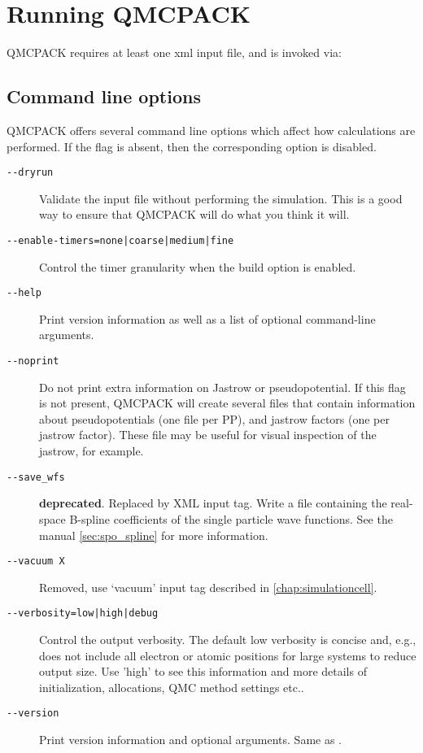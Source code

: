 \chapter{Running QMCPACK}
\label{chap:running}

QMCPACK requires at least one xml input file, and is invoked via:

{}

\section{Command line options}
\label{sec:commandline}
QMCPACK offers several command line options which affect how calculations
are performed. If the flag is absent, then the corresponding
option is disabled.

\begin{description}
\item[\texttt{-{}-dryrun}]{ Validate the input file without performing the simulation.
  This is a good way to ensure that QMCPACK will do what you think it will. }
\item[\texttt{-{}-enable-timers=none|coarse|medium|fine}]{ Control the timer granularity
  when the build option  is enabled. }
\item[\texttt{-{}-help}]{ Print version information as well as a list of optional
  command-line arguments. }
\item[\texttt{-{}-noprint}]{ Do not print extra information on Jastrow or pseudopotential.
  If this flag is not present, QMCPACK will create several  files
  that contain information about pseudopotentials (one file per PP), and jastrow
  factors (one per jastrow factor). These file may be useful for visual inspection
  of the jastrow, for example. }
\item[\texttt{-{}-save\_wfs}]{ \textbf{deprecated}. Replaced by  XML input tag.
  Write a  file containing the real-space B-spline
  coefficients of the single particle wave functions. See the manual
  \ref{sec:spo_spline} for more information.}
\item[\texttt{-{}-vacuum X}]{Removed, use `vacuum' input tag described in \ref{chap:simulationcell}. }
\item[\texttt{-{}-verbosity=low|high|debug}]{ Control the output verbosity. The default low verbosity is concise and, e.g., does not include all electron or atomic positions for large systems to reduce output size. Use 'high' to see this information and more details of initialization, allocations, QMC method settings etc.. }
\item[\texttt{-{}-version}]{ Print version information and optional arguments.
  Same as . }
\end{description}


